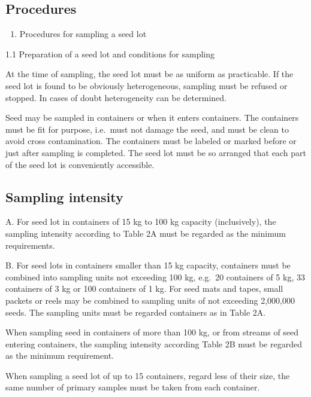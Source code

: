 \documentclass[
]{book}
\providecommand{\tightlist}{%
  \setlength{\itemsep}{0pt}\setlength{\parskip}{0pt}}
\begin{document}
\hypertarget{procedures}{%
\subsection{Procedures}\label{procedures}}

\begin{enumerate}
\def\labelenumi{\arabic{enumi}.}
\tightlist
\item
  Procedures for sampling a seed lot
\end{enumerate}

1.1 Preparation of a seed lot and conditions for sampling

At the time of sampling, the seed lot must be as uniform as practicable. If the seed lot is found to be obviously heterogeneous, sampling must be refused or stopped. In cases of doubt heterogeneity can be determined.

Seed may be sampled in containers or when it enters containers. The containers must be fit for purpose, i.e.~must not damage the seed, and must be clean to avoid cross contamination. The containers must be labeled or marked before or just after sampling is completed. The seed lot must be so arranged that each part of the seed lot is conveniently accessible.

\hypertarget{sampling-intensity-1}{%
\subsection{Sampling intensity}\label{sampling-intensity-1}}

A. For seed lot in containers of 15 kg to 100 kg capacity (inclusively), the sampling intensity according to Table 2A must be regarded as the minimum requirements.

B. For seed lots in containers smaller than 15 kg capacity, containers must be combined into sampling units not exceeding 100 kg, e.g.~20 containers of 5 kg, 33 containers of 3 kg or 100 containers of 1 kg. For seed mats and tapes, small packets or reels may be combined to sampling units of not exceeding 2,000,000 seeds. The sampling units must be regarded containers as in Table 2A.

When sampling seed in containers of more than 100 kg, or from streams of seed entering containers, the sampling intensity according Table 2B must be regarded as the minimum requirement.

When sampling a seed lot of up to 15 containers, regard less of their size, the same number of primary samples must be taken from each container.
\end{document}
